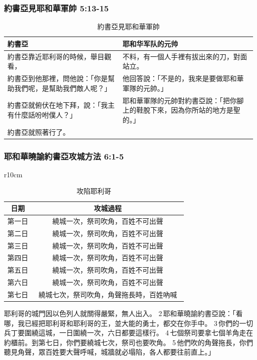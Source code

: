 \subsubsection{約書亞見耶和華軍帥 5:13-15}
\begin{table}[H]
\begin{tabular}{ p{}|p{}} \toprule
\toprule
約書亞 &  耶和华军队的元帅 \\\hline
約書亞靠近耶利哥的時候，舉目觀看， &不料，有一個人手裡有拔出來的刀，對面站立。\tabularnewline
約書亞到他那裡，問他說：「你是幫助我們呢，是幫助我們敵人呢？」 &他回答說：「不是的，我來是要做耶和華軍隊的元帥。」 \tabularnewline
約書亞就俯伏在地下拜，說：「我主有什麼話吩咐僕人？」  &耶和華軍隊的元帥對約書亞說：「把你腳上的鞋脫下來，因為你所站的地方是聖的。」\tabularnewline
約書亞就照著行了。& \tabularnewline
\hline\bottomrule
\end{tabular}
\caption{約書亞見耶和華軍帥}
\end{table} 

\subsubsection{耶和華曉諭約書亞攻城方法 6:1-5}
\begin{table}{r}{10cm}
\centering
\begin{tabular}{|c|c|}
\hline
\hline
日期   & 攻城過程   \\\hline
第一日 & 繞城一次，祭司吹角，百姓不可出聲    \\\hline
第二日 & 繞城一次，祭司吹角，百姓不可出聲\\\hline
第三日 & 繞城一次，祭司吹角，百姓不可出聲 \\\hline
第四日 & 繞城一次，祭司吹角，百姓不可出聲\\\hline
第五日 & 繞城一次，祭司吹角，百姓不可出聲\\\hline
第六日 & 繞城一次，祭司吹角，百姓不可出聲　\\\hline
第七日 & 繞城七次，祭司吹角，角聲拖長時，百姓吶喊　\\\hline
\end{tabular}
\caption{攻陷耶利哥}
\end{table}
耶利哥的城門因以色列人就關得嚴緊，無人出入。 2 耶和華曉諭約書亞說：「看哪，我已經把耶利哥和耶利哥的王，並大能的勇士，都交在你手中。 3 你們的一切兵丁要圍繞這城，一日圍繞一次，六日都要這樣行。 4 七個祭司要拿七個羊角走在約櫃前。到第七日，你們要繞城七次，祭司也要吹角。 5 他們吹的角聲拖長，你們聽見角聲，眾百姓要大聲呼喊，城牆就必塌陷，各人都要往前直上。」



